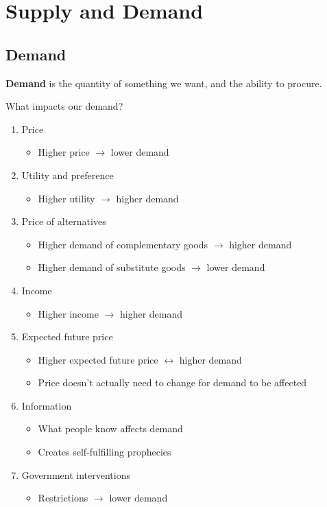 \chapter{Supply and Demand}

\section{Demand}

\begin{def}
  \textbf{Demand} is the quantity of something we want, and the ability to procure.
\end{def}

What impacts our demand?
\begin{enumerate}
  \item Price\begin{itemize}
    \item Higher price $\rightarrow$ lower demand
  \end{itemize}
  \item Utility and preference\begin{itemize}
    \item Higher utility $\rightarrow$ higher demand
  \end{itemize}
  \item Price of alternatives\begin{itemize}
    \item Higher demand of complementary goods $\rightarrow$ higher demand
    \item Higher demand of substitute goods $\rightarrow$ lower demand
  \end{itemize}
  \item Income\begin{itemize}
    \item Higher income $\rightarrow$ higher demand
  \end{itemize}
  \item Expected future price\begin{itemize}
    \item Higher expected future price $\leftrightarrow$ higher demand
    \item Price doesn't actually need to change for demand to be affected
  \end{itemize}
  \item Information\begin{itemize}
    \item What people know affects demand
    \item Creates self-fulfilling prophecies
  \end{itemize}
  \item Government interventions\begin{itemize}
    \item Restrictions $\rightarrow$ lower demand
  \end{itemize}
\end{enumerate}

